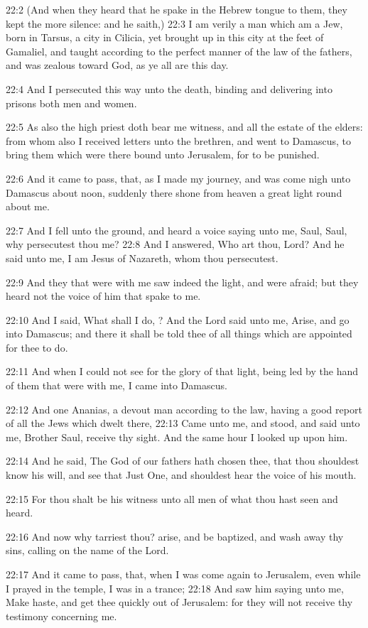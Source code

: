 22:2 (And when they heard that he spake in the Hebrew tongue to them,
they kept the more silence: and he saith,) 22:3 I am verily a man
which am a Jew, born in Tarsus, a city in Cilicia, yet brought up in
this city at the feet of Gamaliel, and taught according to the perfect
manner of the law of the fathers, and was zealous toward God, as ye
all are this day.

22:4 And I persecuted this way unto the death, binding and delivering
into prisons both men and women.

22:5 As also the high priest doth bear me witness, and all the estate
of the elders: from whom also I received letters unto the brethren,
and went to Damascus, to bring them which were there bound unto
Jerusalem, for to be punished.

22:6 And it came to pass, that, as I made my journey, and was come
nigh unto Damascus about noon, suddenly there shone from heaven a
great light round about me.

22:7 And I fell unto the ground, and heard a voice saying unto me,
Saul, Saul, why persecutest thou me?  22:8 And I answered, Who art
thou, Lord? And he said unto me, I am Jesus of Nazareth, whom thou
persecutest.

22:9 And they that were with me saw indeed the light, and were afraid;
but they heard not the voice of him that spake to me.

22:10 And I said, What shall I do, \LORD? And the Lord said unto me,
Arise, and go into Damascus; and there it shall be told thee of all
things which are appointed for thee to do.

22:11 And when I could not see for the glory of that light, being led
by the hand of them that were with me, I came into Damascus.

22:12 And one Ananias, a devout man according to the law, having a
good report of all the Jews which dwelt there, 22:13 Came unto me, and
stood, and said unto me, Brother Saul, receive thy sight. And the same
hour I looked up upon him.

22:14 And he said, The God of our fathers hath chosen thee, that thou
shouldest know his will, and see that Just One, and shouldest hear the
voice of his mouth.

22:15 For thou shalt be his witness unto all men of what thou hast
seen and heard.

22:16 And now why tarriest thou? arise, and be baptized, and wash away
thy sins, calling on the name of the Lord.

22:17 And it came to pass, that, when I was come again to Jerusalem,
even while I prayed in the temple, I was in a trance; 22:18 And saw
him saying unto me, Make haste, and get thee quickly out of Jerusalem:
for they will not receive thy testimony concerning me.

